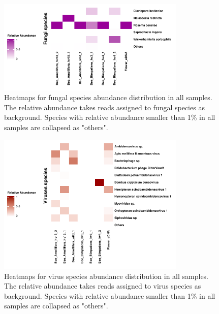 \documentclass[11pt]{article}
\begin{document}
  \begin{figure}[H]
    \centering
    \includegraphics[width=0.8\textwidth]{../Figures/RelativeAbundance_0_01_species_Fungi.pdf}
    \caption{Heatmaps for fungal species abundance distribution in all samples. 
    The relative abundance takes reads assigned to fungal species as background. 
    Species with relative abundance smaller than 1\% in all samples are collapsed as "others".}
    \label{FungusHeatmap}
    \end{figure}

  \begin{figure}[H]
    \centering
    \includegraphics[width=0.8\textwidth]{../Figures/RelativeAbundance_0_01_species_Viruses.pdf}
    \caption{Heatmaps for virus species abundance distribution in all samples. 
    The relative abundance takes reads assigned to virus species as background. 
    Species with relative abundance smaller than 1\% in all samples are collapsed as "others".}
    \label{ViruseHeatmap}
    \end{figure}
  
\end{document}
